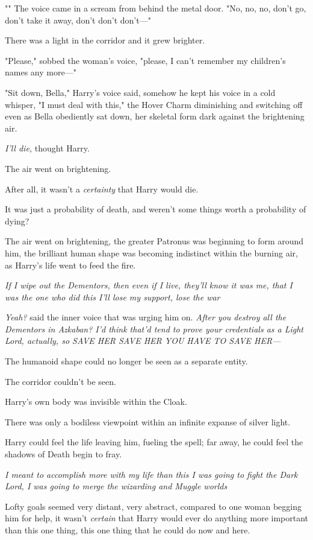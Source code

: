 "" The voice came in a scream from behind the metal door. "No, no, no,
don't go, don't take it away, don't don't don't\mbox{---}"

There was a light in the corridor and it grew brighter.

"Please," sobbed the woman's voice, "please, I can't remember my children's
names any more\mbox{---}"

"Sit down, Bella," Harry's voice said, somehow he kept his voice in a cold
whisper, "I must deal with this," the Hover Charm diminishing and switching off
even as Bella obediently sat down, her skeletal form dark against the
brightening air.

\emph{I'll die,} thought Harry.

The air went on brightening.

After all, it wasn't a \emph{certainty} that Harry would die.

It was just a probability of death, and weren't some things worth a probability
of dying?

The air went on brightening, the greater Patronus was beginning to form around
him, the brilliant human shape was becoming indistinct within the burning air,
as Harry's life went to feed the fire.

\emph{If I wipe out the Dementors, then even if I live, they'll know it was me,
that I was the one who did this{\el} I'll lose my support, lose the
war{\el}}

\emph{Yeah?} said the inner voice that was urging him on. \emph{After you
destroy all the Dementors in Azkaban? I'd think that'd tend to prove your
credentials as a Light Lord, actually, so SAVE HER SAVE HER YOU HAVE TO SAVE
HER---}

The humanoid shape could no longer be seen as a separate entity.

The corridor couldn't be seen.

Harry's own body was invisible within the Cloak.

There was only a bodiless viewpoint within an infinite expanse of silver light.

Harry could feel the life leaving him, fueling the spell; far away, he could
feel the shadows of Death begin to fray.

\emph{I meant to accomplish more with my life than this{\el} I was going to
fight the Dark Lord, I was going to merge the wizarding and Muggle
worlds{\el}}

Lofty goals seemed very distant, very abstract, compared to one woman begging
him for help, it wasn't \emph{certain} that Harry would ever do anything more
important than this one thing, this one thing that he could do now and here.


